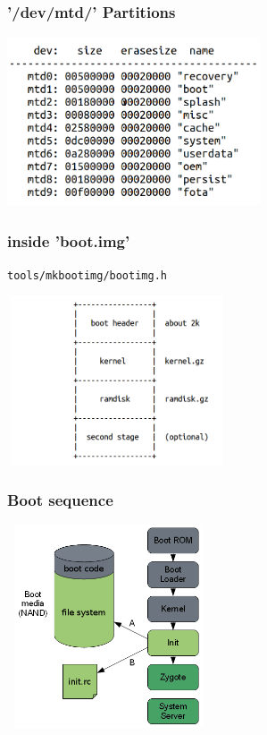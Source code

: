 \documentclass{beamer}
\begin{document}
\begin{frame}
\frametitle{'/dev/mtd/' Partitions}
\begin{center}
\includegraphics[width=7.5cm, height=5cm]{partition_idea_blade.png}
\end{center}
\end{frame}
\begin{frame}
\frametitle{inside 'boot.img'}
\tt{tools/mkbootimg/bootimg.h}
\begin{center}
  \includegraphics[width=6.5cm, height=5cm]{inside-bootimage.png}
\end{center}
\end{frame}
\begin{frame}
\frametitle{Boot sequence}
\begin{center} 
  \includegraphics[width=6cm,height=6cm]{booting.png} 
\end{center} 
\end{frame}
\end{document}
